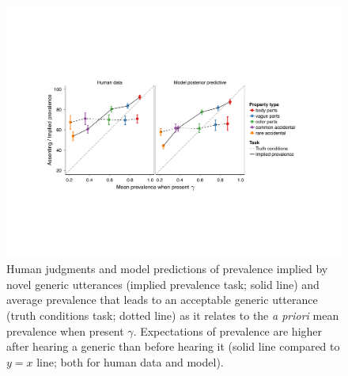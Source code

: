 \documentclass{pnastwo}
\begin{document}
\begin{article}
\begin{figure}
\centering
    \includegraphics[width=1\columnwidth]{asym-lines-data-model-2phi-2so-50kx3.pdf}
    \caption{Human judgments and model predictions of prevalence implied by novel generic utterances (implied prevalence task; solid line) and average prevalence that leads to an acceptable generic utterance (truth conditions task; dotted line) as it relates to the \emph{a priori} mean prevalence when present $\gamma$.
    Expectations of prevalence are higher after hearing a generic than before hearing it (solid line compared to $y=x$ line; both for human data and model).
}
\end{figure}
\end{article}
\end{document}
